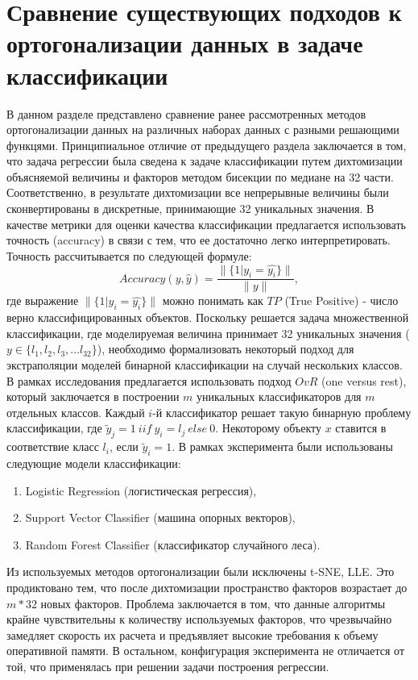 \documentclass[runningheads]{llncs}
\begin{document}
\section*{Сравнение существующих подходов к ортогонализации данных в задаче классификации}
\hspace{0.4cm}
В данном разделе представлено сравнение ранее рассмотренных методов ортогонализации данных на различных наборах данных с разными решающими функцями. Принципиальное отличие от предыдущего раздела заключается в том, что задача регрессии была сведена к задаче классификации путем дихтомизации объясняемой величины и факторов методом бисекции по медиане на 32 части. Соответственно, в результате дихтомизации все непрерывные величины были сконвертированы в дискретные, принимающие 32 уникальных значения. В качестве метрики для оценки качества классификации предлагается использовать точность (accuracy) в связи с тем, что ее достаточно легко интерпретировать. Точность рассчитывается по следующей формуле: $$Accuracy(y, \hat{y}) = \frac{\|\{1 | y_i = \hat{y_i}\}\|}{\|y\|},$$ где выражение $\|\{1 | y_i = \hat{y_i}\}\|$ можно понимать как $TP$ (True Positive) - число верно классифицированных объектов. Поскольку решается задача множественной классификации, где моделируемая величина принимает 32 уникальных значения ($y \in \{l_1, l_2, l_3, ... l_{32}\}$), необходимо формализовать некоторый подход для экстраполяции моделей бинарной классификации на случай нескольких классов. В рамках исследования предлагается использовать подход $OvR$ (one versus rest), который заключается в построении $m$ уникальных классификаторов для $m$ отдельных классов. Каждый $i$-й классификатор решает такую бинарную проблему классификации, где $\tilde{y}_j = 1\ iif\ y_i = l_j\ else\ 0$. Некоторому объекту $x$ ставится в соответствие класс $l_i$, если $\tilde{y}_i = 1$. В рамках эксперимента были использованы следующие модели классификации: \par
\begin{enumerate}
  \item Logistic Regression (логистическая регрессия), 
  \item Support Vector Classifier (машина опорных векторов),
  \item Random Forest Classifier (классификатор случайного леса).
\end{enumerate}

Из используемых методов ортогонализации были исключены t-SNE, LLE. Это продиктовано тем, что после дихтомизации пространство факторов возрастает до $m * 32$ новых факторов. Проблема заключается в том, что данные алгоритмы крайне чувствительны к количеству используемых факторов, что чрезвычайно замедляет скорость их расчета и предъявляет высокие требования к объему оперативной памяти. В остальном, конфигурация эксперимента не отличается от той, что применялась при решении задачи построения регрессии.\par
\newpage
\end{document}

